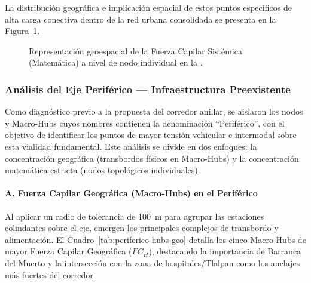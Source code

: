 La distribución geográfica e implicación espacial de estos puntos específicos de
alta carga conectiva dentro de la red urbana consolidada se presenta en la
Figura~\ref{fig:mapa-nodos-matematicos}.

\begin{figure}[H]
    \centering
    \caption[Mapa de Nodos Individuales y Fuerza Capilar Sistémica]{
    Representación geoespacial de la Fuerza Capilar Sistémica (Matemática) a
    nivel de nodo individual en la \zmvm{}.}
    \label{fig:mapa-nodos-matematicos}
\end{figure}

\subsubsection{Análisis del Eje Periférico — Infraestructura Preexistente}
\label{subsubsec:periferico-fc}

Como diagnóstico previo a la propuesta del corredor anillar, se aislaron los nodos
y Macro-Hubs cuyos nombres contienen la denominación ``Periférico'', con el objetivo
de identificar los puntos de mayor tensión vehicular e intermodal sobre esta
vialidad fundamental. Este análisis se divide en dos enfoques: la concentración
geográfica (transbordos físicos en Macro-Hubs) y la concentración matemática
estricta (nodos topológicos individuales).

\paragraph{A. Fuerza Capilar Geográfica (Macro-Hubs) en el Periférico}

Al aplicar un radio de tolerancia de 100~m para agrupar las estaciones colindantes
sobre el eje, emergen los principales complejos de transbordo y alimentación. El
Cuadro~\ref{tab:periferico-hubs-geo} detalla los cinco Macro-Hubs de mayor Fuerza
Capilar Geográfica ($FC_H$), destacando la importancia de Barranca del Muerto y la
intersección con la zona de hospitales/Tlalpan como los anclajes más fuertes del
corredor.

